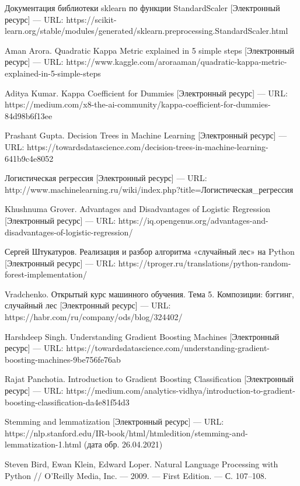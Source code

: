 \documentclass[14pt]{mmcs_article}
\begin{document}
\begin{thebibliography}{0}
Документация библиотеки sklearn по функции StandardScaler  [Электронный ресурс] --- URL:  https://scikit-learn.org/stable/modules/generated/sklearn.preprocessing.StandardScaler.html 

Aman Arora. Quadratic Kappa Metric explained in 5 simple steps  [Электронный ресурс] --- URL:  https://www.kaggle.com/aroraaman/quadratic-kappa-metric-explained-in-5-simple-steps 

Aditya Kumar. Kappa Coefficient for Dummies [Электронный ресурс] --- URL:  https://medium.com/x8-the-ai-community/kappa-coefficient-for-dummies-84d98b6f13ee

Prashant Gupta. Decision Trees in Machine Learning [Электронный ресурс] --- URL:  https://towardsdatascience.com/decision-trees-in-machine-learning-641b9c4e8052

Логистическая регрессия [Электронный ресурс] --- URL:  http://www.machinelearning.ru/wiki/index.php?title=Логистическая\_регрессия 

Khushnuma Grover. Advantages and Disadvantages of Logistic Regression [Электронный ресурс] --- URL:  https://iq.opengenus.org/advantages-and-disadvantages-of-logistic-regression/ 

Сергей Штукатуров. Реализация и разбор алгоритма «случайный лес» на Python [Электронный ресурс] --- URL: https://tproger.ru/translations/python-random-forest-implementation/

Vradchenko. Открытый курс машинного обучения. Тема 5. Композиции: бэггинг, случайный лес [Электронный ресурс] --- URL: https://habr.com/ru/company/ods/blog/324402/ 

Harshdeep Singh. Understanding Gradient Boosting Machines [Электронный ресурс] --- URL: https://towardsdatascience.com/understanding-gradient-boosting-machines-9be756fe76ab

Rajat Panchotia. Introduction to Gradient Boosting Classification [Электронный ресурс] --- URL: https://medium.com/analytics-vidhya/introduction-to-gradient-boosting-classification-da4e81f54d3

Stemming and lemmatization [Электронный ресурс] --- URL: https://nlp.stanford.edu/IR-book/html/htmledition/stemming-and-lemmatization-1.html (дата обр. 26.04.2021)

Steven Bird, Ewan Klein, Edward Loper. Natural Language Processing with Python // O’Reilly Media, Inc. — 2009. — First Edition. — С. 107–108.


\end{thebibliography}
\end{document}
